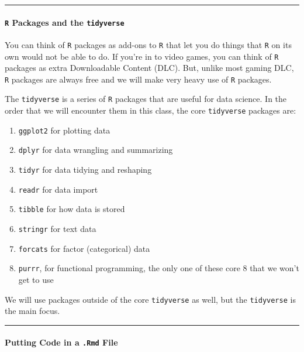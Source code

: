 \documentclass[
]{book}
\providecommand{\tightlist}{%
  \setlength{\itemsep}{0pt}\setlength{\parskip}{0pt}}
\begin{document}
\begin{center}\rule{0.5\linewidth}{0.5pt}\end{center}

\hypertarget{r-packages-and-the-tidyverse}{%
\paragraph{\texorpdfstring{\texttt{R} Packages and the \texttt{tidyverse}}{R Packages and the tidyverse}}\label{r-packages-and-the-tidyverse}}

You can think of \texttt{R} packages as add-ons to \texttt{R} that let you do things that \texttt{R} on its own would not be able to do. If you're in to video games, you can think of \texttt{R} packages as extra Downloadable Content (DLC). But, unlike most gaming DLC, \texttt{R} packages are always free and we will make very heavy use of \texttt{R} packages.

The \texttt{tidyverse} is a series of \texttt{R} packages that are useful for data science. In the order that we will encounter them in this class, the core \texttt{tidyverse} packages are:

\begin{enumerate}
\def\labelenumi{\arabic{enumi}.}
\tightlist
\item
  \texttt{ggplot2} for plotting data
\item
  \texttt{dplyr} for data wrangling and summarizing
\item
  \texttt{tidyr} for data tidying and reshaping
\item
  \texttt{readr} for data import
\item
  \texttt{tibble} for how data is stored
\item
  \texttt{stringr} for text data
\item
  \texttt{forcats} for factor (categorical) data
\item
  \texttt{purrr}, for functional programming, the only one of these core 8 that we won't get to use
\end{enumerate}

We will use packages outside of the core \texttt{tidyverse} as well, but the \texttt{tidyverse} is the main focus.

\begin{center}\rule{0.5\linewidth}{0.5pt}\end{center}

\hypertarget{putting-code-in-a-.rmd-file}{%
\paragraph{\texorpdfstring{Putting Code in a \texttt{.Rmd} File}{Putting Code in a .Rmd File}}\label{putting-code-in-a-.rmd-file}}
\end{document}
